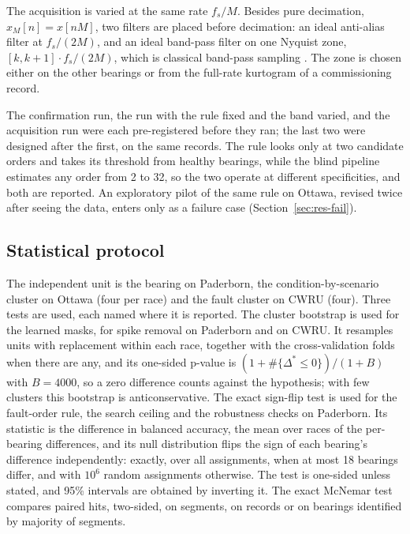 The acquisition is varied at the same rate $f_s/M$. Besides pure decimation, $x_M[n] = x[nM]$, two
filters are placed before decimation: an ideal anti-alias filter at $f_s/(2M)$, and an ideal
band-pass filter on one Nyquist zone, $[k, k+1] \cdot f_s/(2M)$, which is classical band-pass
sampling \citep{vaughan1991,lu2018undersampled}. The zone is chosen either on the other bearings or
from the full-rate kurtogram of a commissioning record.

The confirmation run, the run with the rule fixed and the band varied, and the acquisition run
were each pre-registered before they ran; the last two were designed after the first, on the same
records. The rule looks only at two candidate orders and takes its threshold from healthy bearings,
while the blind pipeline estimates any order from 2 to 32, so the two operate at different
specificities, and both are reported. An exploratory pilot of the same rule on Ottawa, revised
twice after seeing the data, enters only as a failure case (Section~\ref{sec:res-fail}).

\subsection{Statistical protocol}
\label{sec:stats}

The independent unit is the bearing on Paderborn, the condition-by-scenario cluster on Ottawa (four
per race) and the fault cluster on CWRU (four). Three tests are used, each named where it is
reported. The cluster bootstrap is used for the learned masks, for spike removal on Paderborn and
on CWRU. It resamples units with replacement within each race, together with the cross-validation
folds when there are any, and its one-sided p-value is $(1 + \#\{\Delta^* \le 0\})/(1 + B)$ with
$B = 4000$, so a zero difference counts against the hypothesis; with few clusters this bootstrap is
anticonservative. The exact sign-flip test is used for the fault-order rule, the search ceiling
and the robustness checks on Paderborn. Its statistic is the difference in balanced accuracy, the
mean over races of the per-bearing differences, and its null distribution flips the sign of each
bearing's difference independently: exactly, over all assignments, when at most 18 bearings
differ, and with $10^6$ random assignments otherwise. The test is one-sided unless stated, and
95\% intervals are obtained by inverting it. The exact McNemar test compares paired hits, two-sided,
on segments, on records or on bearings identified by majority of segments.

